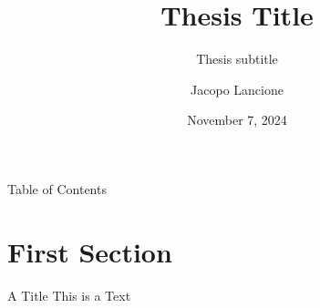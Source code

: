 \documentclass{beamer}
\title{Thesis Title}
\subtitle{Thesis subtitle}
\date{November 7, 2024}
\author{Jacopo Lancione}
\begin{document}
\begin{frame}
    \titlepage
\end{frame}

\begin{frame}{Table of Contents}
    \tableofcontents
\end{frame}


\section{First Section}
\begin{frame}{A Title}
    This is a Text
\end{frame}
\end{document}
